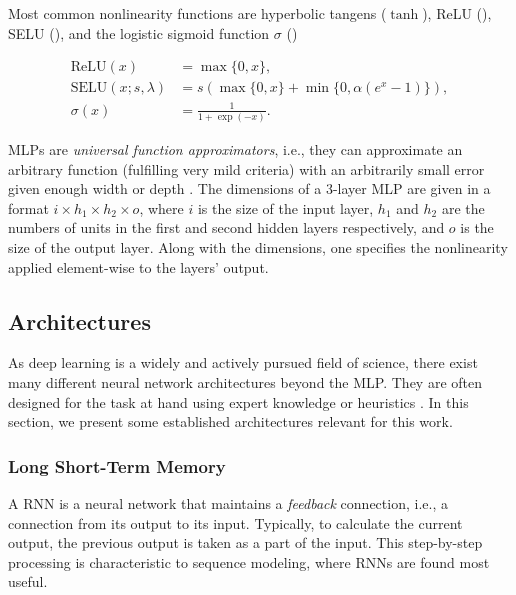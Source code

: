 Most common nonlinearity functions are hyperbolic tangens ($\tanh$), \ac{ReLU} (), \ac{SELU} (), and the logistic sigmoid function $\sigma$ () \cite{Goodfellow-et-al-2016}

\begin{align}
  \text{ReLU}(x) &= \max\{0, x\},\label{eq:relu}\\
  \text{SELU}(x;s,\lambda) &= s (\max\{0,x\} + \min\{0, \alpha(e^x-1)\}), \label{eq:selu}\\
  \sigma (x) &= \frac{1}{1 + \exp (-x)}.\label{eq:logistic_sigmoid}
\end{align}

\acp{MLP} are \emph{universal function approximators}, i.e., they can approximate an arbitrary function (fulfilling very mild criteria) with an arbitrarily small error given enough width or depth \cite{Goodfellow-et-al-2016}.
The dimensions of a 3-layer \ac{MLP} are given in a format $i \times h_1 \times h_2 \times o$, where $i$ is the size of the input layer, $h_1$ and $h_2$ are the numbers of units in the first and second hidden layers respectively, and $o$ is the size of the output layer. Along with the dimensions, one specifies the nonlinearity applied element-wise to the layers' output.

\subsection{Architectures}

As deep learning is a widely and actively pursued field of science, there exist many different neural network architectures beyond the \ac{MLP}. They are often designed for the task at hand using expert knowledge or heuristics \cite{Goodfellow-et-al-2016}. In this section, we present some established architectures relevant for this work.

\subsubsection{Long Short-Term Memory}

A \ac{RNN} is a neural network that maintains a \emph{feedback} connection, i.e., a connection from its output to its input. Typically, to calculate the current output, the previous output is taken as a part of the input. This step-by-step processing is characteristic to sequence modeling, where \acp{RNN} are found most useful.

